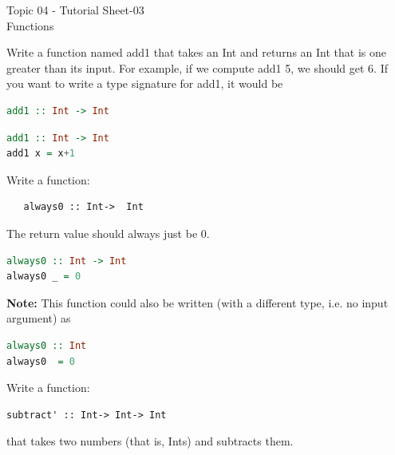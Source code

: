 \documentclass{article}
\newcommand\ExTitle{Functions}
\newcommand\fullExTitle{Topic 04 - Tutorial Sheet-03\\ \ExTitle }
\begin{document}
\begin{Huge}
	\begin{center}
	\fullExTitle
	\end{center}
\end{Huge}

\vspace{1cm}


\begin{exercise}
  Write a function named add1 that takes an Int and returns an Int that is one greater
than its input. For example, if we compute add1 5, we should get 6. If you want to
write a type signature for add1, it would be 
\begin{lstlisting}[language=Haskell]
add1 :: Int -> Int
\end{lstlisting} 

\end{exercise}



\begin{solution}
\begin{lstlisting}[language=Haskell]
add1 :: Int -> Int
add1 x = x+1  
\end{lstlisting}
\end{solution}

\begin{exercise}
Write a function: 
\begin{lstlisting}
   always0 :: Int->  Int
\end{lstlisting}   
The return value should always just be 0.
\end{exercise}


\begin{solution}
  \begin{lstlisting}[language=Haskell]
always0 :: Int -> Int
always0 _ = 0
  \end{lstlisting}
\textbf{Note:} This function could also be written (with a different type, i.e. no input argument) as 
\begin{lstlisting}[language=Haskell]
always0 :: Int
always0  = 0
    \end{lstlisting}
  \end{solution}
\pagebreak
\begin{exercise}
  Write a function:
  \begin{lstlisting}
subtract' :: Int-> Int-> Int
  \end{lstlisting}   
  that takes two numbers (that is, Ints) and subtracts them.
\end{exercise}
\end{document}
